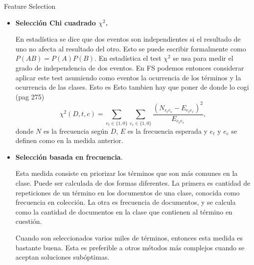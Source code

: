 \documentclass{llncs}
\begin{document}
\begin{subsection}{Feature Selection}
\begin{itemize}
				Computar $A(t,c)$ como el valor esperado de informaci\'on mutua (\emph{Mutual Information} (MI)), nos da una medida de cu\'anta informaci\'on aporta, la presencia en $c$ de un t\'ermino dado, a tomar la decisi\'on correcta de clasificaci\'on de un documento. Lo definimos como \color{red}[Hay que poner aqui que esto se cogio del libro, pagina 272]\color{black}
				\[
					I(U_t;C_t) = \sum_{e_t \in \{ 1,0 \} } \sum_{e_c \in \{ 1,0 \} } P( U_t = e_t, C_t = e_c) \log_2 \frac{P (U_t = e_t, C_t = e_c) }{ P(U_t = e_t) P(C_t = e_c) },
				\]
				donde $U_t$ es una variable aleatoria que toma valor $e_t = 1$ si el documento contiene el t\'ermino $t$ y $e_t = 0$ en otro caso, y $C$ es otra variable aleatoria que toma valor $e_c = 1$ si el documento est\'a en la clase $c$ y $e_c = 0  $ en otro caso. 
				
				\smallskip
	
				MI mide cu\'anta informaci\'on un t\'ermino contiene acerca de una clase. Por tanto, mantener los t\'erminos que est\'an cargados de informaci\'on, y eliminar los que no, contribuye a reducir el ruido y mejorar la precisi\'on del clasificador.
	
			\smallskip
			\item\textbf{Selecci\'on Chi cuadrado $\chi^2$.} 
			\smallskip
			
			En estad\'istica se dice que dos eventos son independientes si el resultado de uno no afecta al resultado del otro. Esto se puede escribir formalmente como $P(AB) = P(A) P(B)$. En estad\'istica el test $\chi^2$ se usa para medir el grado de independencia de dos eventos. En FS podemos entonces considerar aplicar este test asumiendo como eventos la ocurrencia de los t\'erminos y la ocurrencia de las clases. Esto es \color{red} Esto tambien hay que poner de donde lo cogi (pag 275)\color{black} 
			\[
				\chi^2(D,t,c) = \sum_{e_t\in \{ 1, 0 \}} \sum_{e_c\in \{ 1, 0 \}} \frac{(N_{e_te_c} - E_{e_t e_c}) ^2 } { E_{e_t e_c}},
			\]
			donde $N$ es la frecuencia seg\'un $D$, $E$ es la frecuencia esperada y $e_t$ y  $e_c$ se definen como en la medida anterior.
			
			\smallskip
			\item \textbf{Selecci\'on basada en frecuencia}.
			\smallskip
			
			 Esta medida consiste en priorizar los t\'erminos que son m\'as comunes en la  clase. Puede ser calculada de dos formas diferentes. La primera es cantidad de repeticiones de un t\'ermino en los documentos de una clase, conocida como frecuencia en colecci\'on. La otra es frecuencia de documentos, y se calcula como la cantidad de documentos en la clase que contienen al t\'ermino en cuesti\'on.
			
			\smallskip
				
			Cuando son seleccionados varios miles de t\'erminos, entonces esta medida es bastante buena. Esta es preferible a otros m\'etodos m\'as complejos cuando se aceptan soluciones sub\'optimas.
			
		\end{itemize}
	\end{subsection}
	
\end{document}
